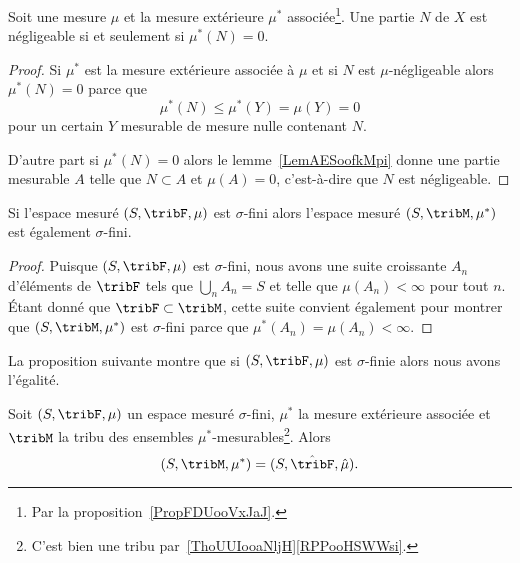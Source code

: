 \begin{corollary}\label{LemXOUNooUbtpxm}
	Soit une mesure \( \mu\) et la mesure extérieure \( \mu^*\) associée\footnote{Par la proposition~\ref{PropFDUooVxJaJ}.}. Une partie \( N\) de \( X\) est négligeable si et seulement si \( \mu^*(N)=0\).
\end{corollary}

\begin{proof}
	Si \( \mu^*\) est la mesure extérieure associée à \( \mu\) et si \( N\) est \( \mu\)-négligeable alors \( \mu^*(N)=0\) parce que
	\begin{equation}
		\mu^*(N)\leq \mu^*(Y)=\mu(Y)=0
	\end{equation}
	pour un certain \( Y\) mesurable de mesure nulle contenant \( N\).

	D'autre part si \( \mu^*(N)=0\) alors le lemme~\ref{LemAESoofkMpi} donne une partie mesurable \( A\) telle que \( N\subset A\) et \( \mu(A)=0\), c'est-à-dire que \( N\) est négligeable.
\end{proof}

\begin{lemma}       \label{LemOAEoocBDaO}
	Si l'espace mesuré \( (S,\tribF,\mu)\) est \( \sigma\)-fini alors l'espace mesuré \( (S,\tribM,\mu^*)\) est également \( \sigma\)-fini.
\end{lemma}

\begin{proof}
	Puisque \( (S,\tribF,\mu)\) est \( \sigma\)-fini, nous avons une suite croissante \( A_n\) d'éléments de \( \tribF\) tels que \( \bigcup_nA_n=S\) et telle que \( \mu(A_n)<\infty\) pour tout \( n\). Étant donné que \( \tribF\subset\tribM\), cette suite convient également pour montrer que \( (S,\tribM,\mu^*)\) est \( \sigma\)-fini parce que \( \mu^*(A_n)=\mu(A_n)<\infty\).
\end{proof}

La proposition suivante montre que si \( (S,\tribF,\mu)\) est \( \sigma\)-finie alors nous avons l'égalité.
\begin{proposition} \label{PropIIHooAIbfj}
	Soit \( (S,\tribF,\mu)\) un espace mesuré \( \sigma\)-fini, \( \mu^*\) la mesure extérieure associée et \( \tribM\) la tribu des ensembles \( \mu^*\)-mesurables\footnote{C'est bien une tribu par~\ref{ThoUUIooaNljH}\ref{RPPooHSWWsi}.}. Alors
	\begin{equation}
		(S,\tribM,\mu^*) = (S,\hat\tribF,\hat\mu).
	\end{equation}
\end{proposition}

